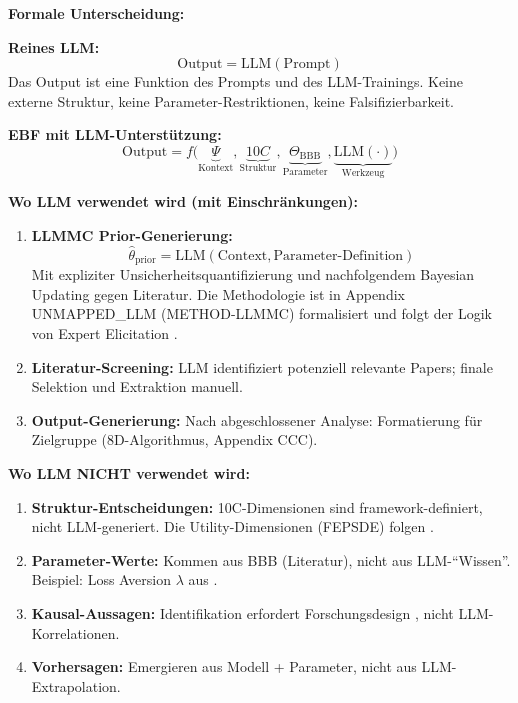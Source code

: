 \begin{tcolorbox}[colback=green!5!white, colframe=green!75!black,
    title=P1-$\mathcal{W}$-L: Lang (Wissenschaft)]

\textbf{Formale Unterscheidung:}

\textbf{Reines LLM:}
\begin{equation}
\text{Output} = \text{LLM}(\text{Prompt})
\end{equation}
Das Output ist eine Funktion des Prompts und des LLM-Trainings. Keine externe Struktur, keine Parameter-Restriktionen, keine Falsifizierbarkeit.

\textbf{EBF mit LLM-Unterstützung:}
\begin{equation}
\text{Output} = f\Big(\underbrace{\Psi}_{\text{Kontext}}, \underbrace{10C}_{\text{Struktur}}, \underbrace{\Theta_{\text{BBB}}}_{\text{Parameter}}, \underbrace{\text{LLM}(\cdot)}_{\text{Werkzeug}}\Big)
\end{equation}

\textbf{Wo LLM verwendet wird (mit Einschränkungen):}

\begin{enumerate}
    \item \textbf{LLMMC Prior-Generierung:}
    \begin{equation}
    \hat{\theta}_{\text{prior}} = \text{LLM}(\text{Context}, \text{Parameter-Definition})
    \end{equation}
    Mit expliziter Unsicherheitsquantifizierung und nachfolgendem Bayesian Updating gegen Literatur. Die Methodologie ist in Appendix UNMAPPED_LLM (METHOD-LLMMC) formalisiert und folgt der Logik von Expert Elicitation \citep{ohaganelicitation}.

    \item \textbf{Literatur-Screening:}
    LLM identifiziert potenziell relevante Papers; finale Selektion und Extraktion manuell.

    \item \textbf{Output-Generierung:}
    Nach abgeschlossener Analyse: Formatierung für Zielgruppe (8D-Algorithmus, Appendix CCC).
\end{enumerate}

\textbf{Wo LLM NICHT verwendet wird:}

\begin{enumerate}
    \item \textbf{Struktur-Entscheidungen:} 10C-Dimensionen sind framework-definiert, nicht LLM-generiert. Die Utility-Dimensionen (FEPSDE) folgen \citet{gaechter2002altruistic}.
    \item \textbf{Parameter-Werte:} Kommen aus BBB (Literatur), nicht aus LLM-``Wissen''. Beispiel: Loss Aversion $\lambda$ aus \citet{kahneman1979prospectprospect}.
    \item \textbf{Kausal-Aussagen:} Identifikation erfordert Forschungsdesign \citep{camerer2003behavioralbehavioral}, nicht LLM-Korrelationen.
    \item \textbf{Vorhersagen:} Emergieren aus Modell + Parameter, nicht aus LLM-Extrapolation.
\end{enumerate}


\end{tcolorbox}
